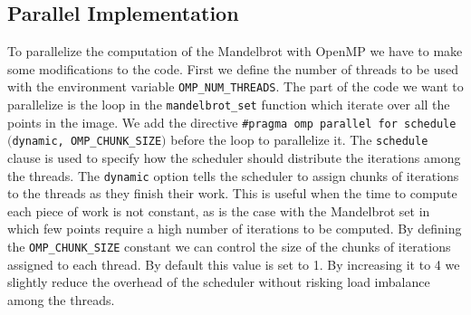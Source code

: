 \subsection{Parallel Implementation}
    To parallelize the computation of the Mandelbrot with OpenMP we have to
    make some modifications to the code. First we define the number of threads
    to be used with the environment variable \texttt{OMP\_NUM\_THREADS}.
    The part of the code we want to parallelize is the loop in the \texttt{mandelbrot\_set}
    function which iterate over all the points in the image. We add the directive
    \texttt{\#pragma omp parallel for schedule $($dynamic, OMP\_CHUNK\_SIZE$)$} before
    the loop to parallelize it. The \texttt{schedule} clause is used to specify how
    the scheduler should distribute the iterations among the threads. The \texttt{dynamic}
    option tells the scheduler to assign chunks of iterations to the threads as they
    finish their work. This is useful when the time to compute each piece of work is not
    constant, as is the case with the Mandelbrot set in which few points require
    a high number of iterations to be computed. By defining the \texttt{OMP\_CHUNK\_SIZE}
    constant we can control the size of the chunks of iterations assigned to each thread.
    By default this value is set to 1. By increasing it to 4 we slightly reduce the overhead
    of the scheduler without risking load imbalance among the threads. \\

